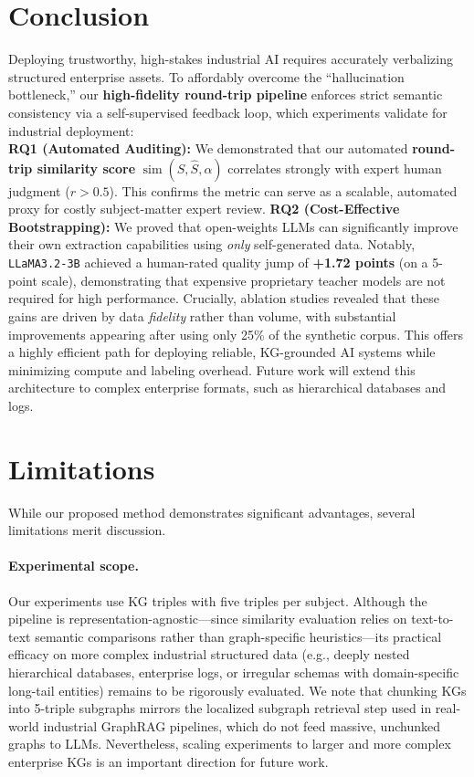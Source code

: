 \documentclass[11pt]{article}
\begin{document}
\section{Conclusion}

Deploying trustworthy, high-stakes industrial AI requires accurately verbalizing structured enterprise assets. To affordably overcome the ``hallucination bottleneck,'' our \textbf{high-fidelity round-trip pipeline} enforces strict semantic consistency via a self-supervised feedback loop, which experiments validate for industrial deployment:\\
\noindent \textbf{RQ1 (Automated Auditing):} We demonstrated that our automated \textbf{round-trip similarity score} $\operatorname{sim}(S,\hat S, \alpha)$ correlates strongly with expert human judgment ($r > 0.5$). This confirms the metric can serve as a scalable, automated proxy for costly subject-matter expert review.
\noindent \textbf{RQ2 (Cost-Effective Bootstrapping):} We proved that open-weights LLMs can significantly improve their own extraction capabilities using \emph{only} self-generated data. Notably, \texttt{LLaMA3.2-3B} achieved a human-rated quality jump of \textbf{+1.72 points} (on a 5-point scale), demonstrating that expensive proprietary teacher models are not required for high performance.
Crucially, ablation studies revealed that these gains are driven by data \emph{fidelity} rather than volume, with substantial improvements appearing after using only 25\% of the synthetic corpus. This offers a highly efficient path for deploying reliable, KG-grounded AI systems while minimizing compute and labeling overhead. Future work will extend this architecture to complex enterprise formats, such as hierarchical databases and logs.

\section*{Limitations}

While our proposed method demonstrates significant advantages, several limitations merit discussion.

\paragraph{Experimental scope.}
Our experiments use KG triples with five triples per subject. Although the pipeline is representation-agnostic---since similarity evaluation relies on text-to-text semantic comparisons rather than graph-specific heuristics---its practical efficacy on more complex industrial structured data (e.g., deeply nested hierarchical databases, enterprise logs, or irregular schemas with domain-specific long-tail entities) remains to be rigorously evaluated. We note that chunking KGs into 5-triple subgraphs mirrors the localized subgraph retrieval step used in real-world industrial GraphRAG pipelines, which do not feed massive, unchunked graphs to LLMs. Nevertheless, scaling experiments to larger and more complex enterprise KGs is an important direction for future work.
\end{document}
